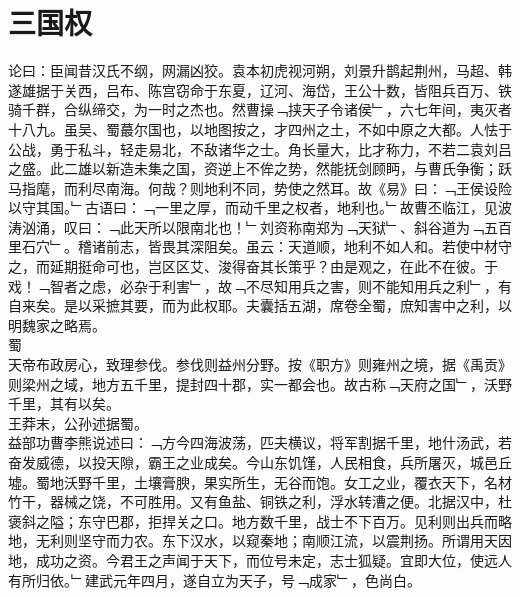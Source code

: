 {\chapter{三国权}%
论曰：臣闻昔汉氏不纲，网漏凶狡。袁本初虎视河朔，刘景升鹊起荆州，马超、韩遂雄据于关西，吕布、陈宫窃命于东夏，辽河、海岱，王公十数，皆阻兵百万、铁骑千群，合纵缔交，为一时之杰也。然曹操﹁挟天子令诸侯﹂，六七年间，夷灭者十八九。虽吴、蜀蕞尔国也，以地图按之，才四州之土，不如中原之大都。人怯于公战，勇于私斗，轻走易北，不敌诸华之士。角长量大，比才称力，不若二袁刘吕之盛。此二雄以新造未集之国，资逆上不侔之势，然能抚剑顾眄，与曹氏争衡；跃马指麾，而利尽南海。何哉？则地利不同，势使之然耳。故《易》曰：﹁王侯设险以守其国。﹂古语曰：﹁一里之厚，而动千里之权者，地利也。﹂故曹丕临江，见波涛汹涌，叹曰：﹁此天所以限南北也！﹂刘资称南郑为﹁天狱﹂、斜谷道为﹁五百里石穴﹂。稽诸前志，皆畏其深阻矣。虽云：天道顺，地利不如人和。若使中材守之，而延期挺命可也，岂区区艾、浚得奋其长策乎？由是观之，在此不在彼。于戏！﹁智者之虑，必杂于利害﹂，故﹁不尽知用兵之害，则不能知用兵之利﹂，有自来矣。是以采摭其要，而为此权耶。夫囊括五湖，席卷全蜀，庶知害中之利，以明魏家之略焉。\\
蜀\\
天帝布政房心，致理参伐。参伐则益州分野。按《职方》则雍州之境，据《禹贡》则梁州之域，地方五千里，提封四十郡，实一都会也。故古称﹁天府之国﹂，沃野千里，其有以矣。\\
王莽末，公孙述据蜀。\\
益部功曹李熊说述曰：﹁方今四海波荡，匹夫横议，将军割据千里，地什汤武，若奋发威德，以投天隙，霸王之业成矣。今山东饥馑，人民相食，兵所屠灭，城邑丘墟。蜀地沃野千里，土壤膏腴，果实所生，无谷而饱。女工之业，覆衣天下，名材竹干，器械之饶，不可胜用。又有鱼盐、铜铁之利，浮水转漕之便。北据汉中，杜褒斜之隘；东守巴郡，拒捍关之口。地方数千里，战士不下百万。见利则出兵而略地，无利则坚守而力农。东下汉水，以窥秦地；南顺江流，以震荆扬。所谓用天因地，成功之资。今君王之声闻于天下，而位号未定，志士狐疑。宜即大位，使远人有所归依。﹂建武元年四月，遂自立为天子，号﹁成家﹂，色尚白。\\
}
